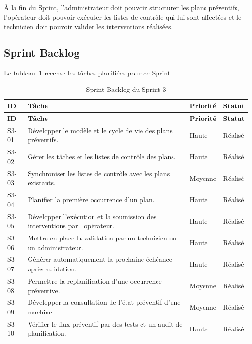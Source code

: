 À la fin du Sprint, l'administrateur doit pouvoir structurer les plans préventifs, l'opérateur doit pouvoir exécuter les listes de contrôle qui lui sont affectées et le technicien doit pouvoir valider les interventions réalisées.

\subsection{Sprint Backlog}

Le tableau~\ref{tab:sprint3-backlog} recense les tâches planifiées pour ce Sprint.

{\small
\setlength{\tabcolsep}{5pt}
\begin{longtable}{|p{1cm}|p{10.3cm}|p{1.5cm}|p{1.4cm}|}
\caption{Sprint Backlog du Sprint 3}
\label{tab:sprint3-backlog}\\
\hline
\textbf{ID} & \textbf{Tâche} & \textbf{Priorité} & \textbf{Statut} \\
\hline
\endfirsthead

\hline
\textbf{ID} & \textbf{Tâche} & \textbf{Priorité} & \textbf{Statut} \\
\hline
\endhead

S3-01 &
Développer le modèle et le cycle de vie des plans préventifs. &
Haute & Réalisé \\
\hline

S3-02 &
Gérer les tâches et les listes de contrôle des plans. &
Haute & Réalisé \\
\hline

S3-03 &
Synchroniser les listes de contrôle avec les plans existants. &
Moyenne & Réalisé \\
\hline

S3-04 &
Planifier la première occurrence d'un plan. &
Haute & Réalisé \\
\hline

S3-05 &
Développer l'exécution et la soumission des interventions par l'opérateur. &
Haute & Réalisé \\
\hline

S3-06 &
Mettre en place la validation par un technicien ou un administrateur. &
Haute & Réalisé \\
\hline

S3-07 &
Générer automatiquement la prochaine échéance après validation. &
Haute & Réalisé \\
\hline

S3-08 &
Permettre la replanification d'une occurrence préventive. &
Moyenne & Réalisé \\
\hline

S3-09 &
Développer la consultation de l'état préventif d'une machine. &
Moyenne & Réalisé \\
\hline

S3-10 &
Vérifier le flux préventif par des tests et un audit de planification. &
Haute & Réalisé \\
\hline

\end{longtable}}

